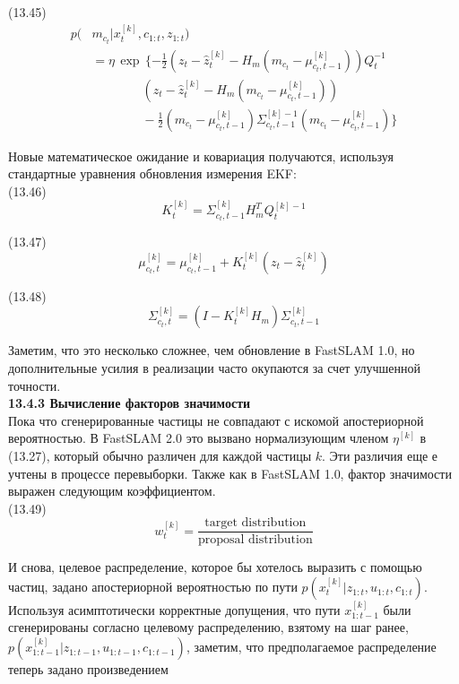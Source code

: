 \documentclass[10pt,a4paper]{article}
\begin{document}
(13.45)
\begin{equation*}
\begin{split}
p(&m_{c_t}|x_t^{[k]},c_{1:t},z_{1:t})\\
&=\eta\,\exp\,\{-\frac{1}{2}(z_t-\hat{z}_t^{[k]}-H_m(m_{c_t}-\mu_{c_t,t-1}^{[k]}))Q_t^{-1}\\
&\qquad\qquad(z_t-\hat{z}_t^{[k]}-H_m(m_{c_t}-\mu_{c_t,t-1}^{[k]}))\\
&\qquad\qquad-\frac{1}{2}(m_{c_t}-\mu_{c_t,t-1}^{[k]})\varSigma_{c_t,t-1}^{[k]-1}(m_{c_t}-\mu_{c_t,t-1}^{[k]})\}
\end{split}
\end{equation*}

Новые математическое ожидание и ковариация получаются, используя стандартные уравнения обновления измерения EKF:\\

(13.46)
$$K_t^{[k]}=\varSigma_{c_t,t-1}^{[k]}H_m^TQ_t^{[k]-1}$$

(13.47)
$$\mu_{c_t,t}^{[k]}=\mu_{c_t,t-1}^{[k]}+K_t^{[k]}(z_t-\hat{z}_t^{[k]})$$

(13.48)
$$\varSigma_{c_t,t}^{[k]}=(I-K_t^{[k]}H_m)\varSigma_{c_t,t-1}^{[k]}$$

Заметим, что это несколько сложнее, чем обновление в FastSLAM 1.0, но дополнительные усилия в реализации часто окупаются за счет улучшенной точности.\\

\textbf{13.4.3	Вычисление факторов значимости}\\

Пока что сгенерированные частицы не совпадают с искомой апостериорной вероятностью. В FastSLAM 2.0 это вызвано нормализующим членом $\eta^{[k]}$ в (13.27), который обычно различен для каждой частицы $k$. Эти различия еще е учтены в процессе перевыборки. Также как в FastSLAM 1.0, фактор значимости выражен следующим коэффициентом.\\

(13.49)
$$w_t^{[k]}=\frac{\text{target distribution}}{\text{proposal distribution}}$$

И снова, целевое распределение, которое бы хотелось выразить с помощью частиц, задано апостериорной вероятностью по пути  $p(x_t^{[k]}|z_{1:t}, u_{1:t}, c_{1:t})$.  Используя асимптотически корректные допущения, что пути $x_{1:t-1}^{[k]}$ были сгенерированы согласно целевому распределению, взятому на шаг ранее, $p(x_{1:t-1}^{[k]}|z_{1:t-1}, u_{1:t-1}, c_{1:t-1})$,
заметим, что предполагаемое распределение теперь задано произведением \\
\end{document}

